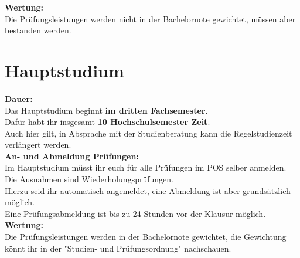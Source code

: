 \documentclass[11pt, a4paper, oneside]{book}
\begin{document}
\textbf{Wertung:}\\
Die Prüfungsleistungen werden nicht in der Bachelornote gewichtet, müssen aber bestanden werden.\\ 

\section{Hauptstudium}

\textbf{Dauer:}\\
Das Hauptstudium beginnt \textbf{im dritten Fachsemester}.\\
Dafür habt ihr insgesamt \textbf{10 Hochschulsemester Zeit}.\\
Auch hier gilt, in Absprache mit der Studienberatung kann die Regelstudienzeit verlängert werden.\\

\textbf{An- und Abmeldung Prüfungen:}\\
Im Hauptstudium müsst ihr euch für alle Prüfungen im POS selber anmelden.\\
Die Ausnahmen sind Wiederholungsprüfungen.\\
Hierzu seid ihr automatisch angemeldet, eine Abmeldung ist aber grundsätzlich möglich.\\ %
Eine Prüfungsabmeldung ist bis zu 24 Stunden vor der Klausur möglich.\\

\textbf{Wertung:}\\
Die Prüfungsleistungen werden in der Bachelornote gewichtet, die Gewichtung könnt ihr in der "Studien- und Prüfungsordnung" nachschauen.\\
\end{document}

